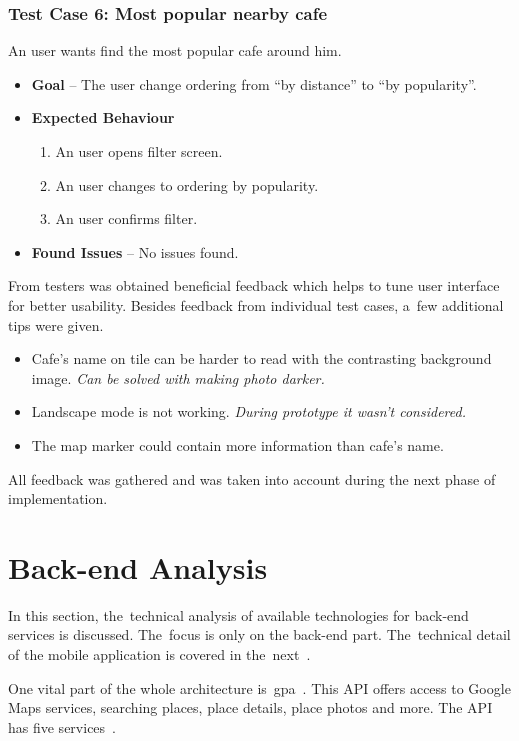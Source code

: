 \subsubsection{Test Case 6: Most popular nearby cafe}
An user wants find the most popular cafe around him. 
\begin{itemize}
    \item \textbf{Goal} -- The user change ordering from ``by distance'' to ``by popularity''.
    \item \textbf{Expected Behaviour}
    \begin{enumerate}
        \item An user opens filter screen.
        \item An user changes to ordering by popularity.
        \item An user confirms filter.
    \end{enumerate}
    \item \textbf{Found Issues} -- No issues found.
\end{itemize}

From testers was obtained beneficial feedback which helps to tune user interface for better usability. Besides feedback from individual test cases, a~few additional tips were given.

\begin{itemize}
    \item Cafe's name on tile can be harder to read with the contrasting background image. \textit{Can be solved with making photo darker.}
    \item Landscape mode is not working. \textit{During prototype it wasn't considered.}
    \item The map marker could contain more information than cafe's name.
\end{itemize}

All feedback was gathered and was taken into account during the next phase of implementation.
\section{Back-end Analysis}
In this section, the~technical analysis of available technologies for back-end services is discussed. The~focus is only on the back-end part. The~technical detail of the mobile application is covered in the~next~.

One vital part of the whole architecture is~\gls{gpa}~\cite{google-places-api}. This API offers access to Google Maps services, searching places, place details, place photos and more. The API has five services~\cite{google-places-api}. 

